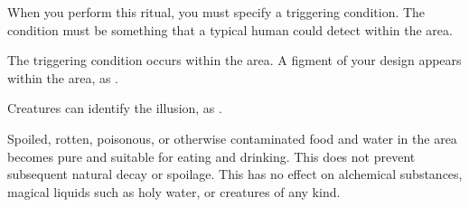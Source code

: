 \begin{comment}
\spellsection{Prestidigitation}{1}
\spellinfo{Universal}{Arcane}
\spelltime{1 minute}
\spelltwocol{\spelltgt{See text}}{\spellrng{Personal/\rngclose}}
\spelldur{1 hour}
\spellsr{Yes}
\spelleffect This ritual enables you to perform simple magical effects for 1 hour on objects or creatures within \rngclose range of you by concentrating (a standard action). The effects are minor and have severe limitations. A \spell{prestidigitation} can slowly lift 1 pound of material. It can color, clean, or soil items in a 1-foot cube each round. It can chill, warm, or flavor 1 pound of nonliving material. It cannot deal damage or affect the concentration of spellcasters. \spell{Prestidigitation} can create small objects, but they look crude and artificial. The materials created by a prestidigitation spell are extremely fragile, and they cannot be used as tools, weapons, or spell components.
\spellnotes This ritual lacks the power to duplicate spell effects. Any actual change to an object (beyond just moving, cleaning, or soiling it) persists only 1 hour. Creatures and attended objects, such as the clothes a creature is wearing, cannot be affected unless the creature is willing. Spell resistance does not apply to you, but it does apply to any objects or creatures you try to affect.
\ritualcost*{1}
\end{comment}

\spellspecial When you perform this ritual, you must specify a triggering condition. The condition must be something that a typical human could detect within the area.
\begin{spelltrigger}{The triggering condition occurs within the area}.
    \spelleffect A figment of your design appears within the area, as .
\end{spelltrigger}
\spellnotes Creatures can identify the illusion, as .

\spellline
\spelleffect Spoiled, rotten, poisonous, or otherwise contaminated food and water in the area becomes pure and suitable for eating and drinking. This does not prevent subsequent natural decay or spoilage.
\spellnotes This has no effect on alchemical substances, magical liquids such as holy water, or creatures of any kind.

